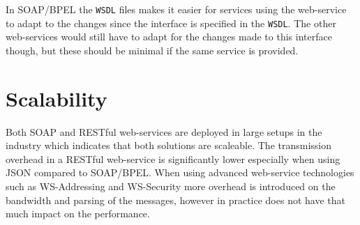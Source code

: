In SOAP/BPEL the \texttt{WSDL} files makes it easier for services using the web-service to adapt to the changes since the interface is specified in the \texttt{WSDL}. The other web-services would still have to adapt for the changes made to this interface though, but these should be minimal if the same service is provided.

\section{Scalability}
Both SOAP and RESTful web-services are deployed in large setups in the industry which indicates that both solutions are scaleable. The transmission overhead in a RESTful web-service is significantly lower especially when using JSON compared to SOAP/BPEL. When using advanced web-service technologies such as WS-Addressing and WS-Security more overhead is introduced on the bandwidth and parsing of the messages, however in practice does not have that much impact on the performance.

